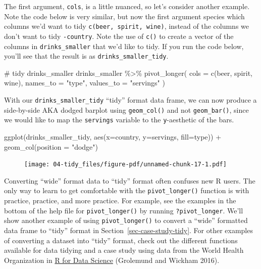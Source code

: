 \documentclass[
  letterpaper,
  DIV=11,
  numbers=noendperiod]{scrreprt}
\newenvironment{Shaded}{\begin{snugshade}}{\end{snugshade}}
\newcommand{\AttributeTok}[1]{\textcolor[rgb]{0.40,0.45,0.13}{#1}}
\newcommand{\CommentTok}[1]{\textcolor[rgb]{0.37,0.37,0.37}{#1}}
\newcommand{\FunctionTok}[1]{\textcolor[rgb]{0.28,0.35,0.67}{#1}}
\newcommand{\NormalTok}[1]{\textcolor[rgb]{0.00,0.23,0.31}{#1}}
\newcommand{\SpecialCharTok}[1]{\textcolor[rgb]{0.37,0.37,0.37}{#1}}
\newcommand{\StringTok}[1]{\textcolor[rgb]{0.13,0.47,0.30}{#1}}
\theoremstyle{definition}
\theoremstyle{remark}
\begin{document}
The first argument, \texttt{cols}, is a little nuanced, so let's
consider another example. Note the code below is very similar, but now
the first argument species which columns we'd want to tidy
\texttt{c(beer,\ spirit,\ wine)}, instead of the columns we don't want
to tidy \texttt{-country}. Note the use of \texttt{c()} to create a
vector of the columns in \texttt{drinks\_smaller} that we'd like to
tidy. If you run the code below, you'll see that the result is as
\texttt{drinks\_smaller\_tidy}.

\begin{Shaded}
\begin{Highlighting}[]
\CommentTok{\# tidy drinks\_smaller}
\NormalTok{drinks\_smaller }\SpecialCharTok{\%\textgreater{}\%} 
  \FunctionTok{pivot\_longer}\NormalTok{(}
    \AttributeTok{cols =} \FunctionTok{c}\NormalTok{(beer, spirit, wine),}
    \AttributeTok{names\_to =} \StringTok{"type"}\NormalTok{, }
    \AttributeTok{values\_to =} \StringTok{"servings"}
\NormalTok{    )}
\end{Highlighting}
\end{Shaded}

With our \texttt{drinks\_smaller\_tidy} ``tidy'' format data frame, we
can now produce a side-by-side AKA dodged barplot using
\texttt{geom\_col()} and not \texttt{geom\_bar()}, since we would like
to map the \texttt{servings} variable to the \texttt{y}-aesthetic of the
bars.

\begin{Shaded}
\begin{Highlighting}[]
\FunctionTok{ggplot}\NormalTok{(drinks\_smaller\_tidy, }\FunctionTok{aes}\NormalTok{(}\AttributeTok{x=}\NormalTok{country, }\AttributeTok{y=}\NormalTok{servings, }\AttributeTok{fill=}\NormalTok{type)) }\SpecialCharTok{+}
  \FunctionTok{geom\_col}\NormalTok{(}\AttributeTok{position =} \StringTok{"dodge"}\NormalTok{)}
\end{Highlighting}
\end{Shaded}

\begin{figure}[H]

{\centering \texttt{[image: 04-tidy\_files/figure-pdf/unnamed-chunk-17-1.pdf]}

}

\end{figure}

Converting ``wide'' format data to ``tidy'' format often confuses new R
users. The only way to learn to get comfortable with the
\texttt{pivot\_longer()} function is with practice, practice, and more
practice. For example, see the examples in the bottom of the help file
for \texttt{pivot\_longer()} by running \texttt{?pivot\_longer}. We'll
show another example of using \texttt{pivot\_longer()} to convert a
``wide'' formatted data frame to ``tidy'' format in
Section~\ref{sec-case-study-tidy}. For other examples of converting a
dataset into ``tidy'' format, check out the different functions
available for data tidying and a case study using data from the World
Health Organization in \href{http://r4ds.had.co.nz/tidy-data.html}{R for
Data Science} (Grolemund and Wickham 2016).
\end{document}

